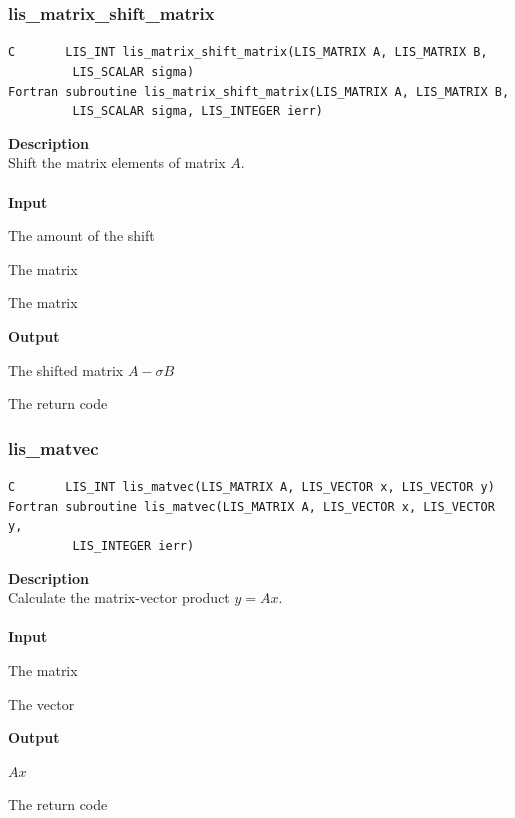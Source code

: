 \documentclass[a4paper]{article}
\newcommand{\namelistlabel}[1]{\mbox{#1}\hfill}
\newenvironment{namelist}[1]{%
\begin{list}{}
  {\let\makelabel\namelistlabel
  \settowidth{\labelwidth}{#1}
  \setlength{\leftmargin}{1.1\labelwidth}}
  }{%
\end{list}}
\begin{document}
\subsubsection{lis\_matrix\_shift\_matrix}
\begin{screen}
\verb|C       LIS_INT lis_matrix_shift_matrix(LIS_MATRIX A, LIS_MATRIX B,|\\
\verb|         LIS_SCALAR sigma)|\\
\verb|Fortran subroutine lis_matrix_shift_matrix(LIS_MATRIX A, LIS_MATRIX B,|\\\verb|         LIS_SCALAR sigma, LIS_INTEGER ierr) |
\end{screen}
{\bf Description}\\
\indent
Shift the matrix elements of matrix $A$.
\\ \\
\noindent
{\bf Input}
\begin{namelist}{XXXXXXXXXXXXXXXXXXXX}
\item[\tt sigma] The amount of the shift
\item[\tt A] The matrix
\item[\tt B] The matrix  
\end{namelist}
{\bf Output}
\begin{namelist}{XXXXXXXXXXXXXXXXXXXX}
\item[\tt A] The shifted matrix $A-\sigma B$
\item[\tt ierr] The return code
\end{namelist}

\newpage
\subsubsection{lis\_matvec}
\begin{screen}
\verb|C       LIS_INT lis_matvec(LIS_MATRIX A, LIS_VECTOR x, LIS_VECTOR y)|\\
\verb|Fortran subroutine lis_matvec(LIS_MATRIX A, LIS_VECTOR x, LIS_VECTOR y,|\\
\verb|         LIS_INTEGER ierr)|
\end{screen}
{\bf Description}\\
\indent
Calculate the matrix-vector product $y=Ax$.
\\ \\
\noindent
{\bf Input}
\begin{namelist}{XXXXXXXXXXXXXXXXXXXX}
\item[\tt A] The matrix
\item[\tt x] The vector
\end{namelist}
{\bf Output}
\begin{namelist}{XXXXXXXXXXXXXXXXXXXX}
\item[\tt y] $Ax$
\item[\tt ierr] The return code
\end{namelist}
\end{document}
